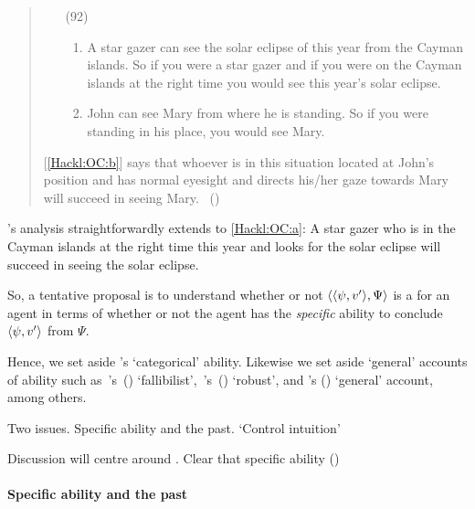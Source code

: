 \begin{note}
  \begin{quote}
    \begin{enumerate}
    \item[(92)]
      \begin{enumerate}[label=\alph*., ref=(\alph*)]
      \item
        \label{Hackl:OC:a}
        A star gazer can see the solar eclipse of this year from the Cayman islands.\newline
        So if you were a star gazer and if you were on the Cayman islands at the right time you would see this year's solar eclipse.
      \item
        \label{Hackl:OC:b}
        John can see Mary from where he is standing.\newline
        So if you were standing in his place, you would see Mary.
      \end{enumerate}
    \end{enumerate}

    [\ref{Hackl:OC:b}] says that whoever is in this situation located at John's position and has normal eyesight and directs his/her gaze towards Mary will succeed in seeing Mary.%
    \mbox{ }\hfill\mbox{(\citeyear[39]{Hackl:1998tt})}
  \end{quote}
  \citeauthor{Hackl:1998tt}'s analysis straightforwardly extends to \ref{Hackl:OC:a}:
  A star gazer who is in the Cayman islands at the right time this year and looks for the solar eclipse will succeed in seeing the solar eclipse.

  So, a tentative proposal is to understand whether or not \(\langle \langle \psi, v' \rangle, \Psi \rangle\) is a \fc{} for an agent in terms of whether or not the agent has the \emph{specific} ability to conclude \(\langle \psi, v' \rangle\) from \(\Psi\).

  Hence, we set aside \citeauthor{Austin:1961vz}'s `categorical' ability.
  Likewise we set aside `general' accounts of ability such as~\citeauthor{Carter:2021wd}'s~(\citeyear{Carter:2021wd}) `fallibilist',~\citeauthor{Kikkert:2022wp}'s~(\citeyear{Kikkert:2022wp}) `robust', and \citeauthor{Maier:2013vk}'s (\citeyear{Maier:2013vk}) `general' account, among others.

  Two issues.
  Specific ability and the past.
  `Control intuition'

  Discussion will centre around \textcite{Boylan:2020aa}.
  Clear that specific ability (\citeyear[23, fn.3]{Boylan:2020aa})
\end{note}

\paragraph{Specific ability and the past}

